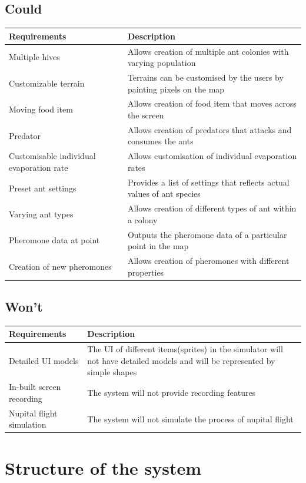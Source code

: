 \documentclass[a4paper, oneside, 11pt]{report}
\begin{document}
\subsection{Could}
\begin{tabular}{|| p{3.5cm} | p{10.5cm} ||} 
	\hline
	Requirements & Description \\
	\hline
	Multiple hives & Allows creation of multiple ant colonies with varying population \\
	\hline
	Customizable terrain & Terrains can be customised by the users by painting pixels on the map \\
	\hline
	Moving food item & Allows creation of food item that moves across the screen \\
	\hline
	Predator & Allows creation of predators that attacks and consumes the ants\\
	\hline
	Customisable individual evaporation rate & Allows customisation of individual evaporation rates \\
	\hline
	Preset ant settings & Provides a list of settings that reflects actual values of ant species \\
	\hline
	Varying ant types & Allows creation of different types of ant within a colony \\
	\hline
	Pheromone data at point & Outputs the pheromone data of a particular point in the map\\
	\hline
	Creation of new pheromones & Allows creation of pheromones with different properties\\
	\hline
\end{tabular}

\subsection{Won't}
\begin{tabular}{|| p{3.5cm} | p{10.5cm} ||} 
	\hline
	Requirements & Description \\
	\hline
	Detailed UI models &  The UI of different items(sprites) in the simulator will not have detailed models and will be represented by simple shapes\\
	\hline
	In-built screen recording & The system will not provide recording features \\
	\hline
	Nupital flight simulation & The system will not simulate the process of nupital flight \\
	\hline
\end{tabular}

\section{Structure of the system}
\end{document}
